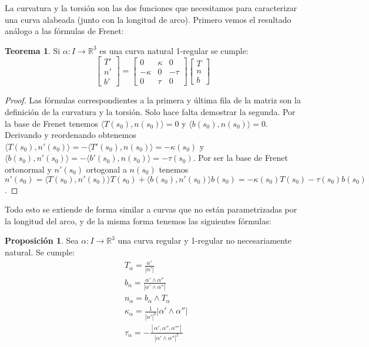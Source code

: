 \documentclass{article}
\theoremstyle{definition}
\newtheorem{theorem}{Teorema}
\newtheorem{prop}{Proposición}
\newcommand{\reales}{\mathbb{R}}
\begin{document}
La curvatura y la torsión son las dos funciones que necesitamos para caracterizar una curva alabeada (junto con la longitud de arco). Primero vemos el resultado análogo a las fórmulas de Frenet:

\begin{theorem}
	Si $\alpha: I \rightarrow \reales^3$ es una curva natural 1-regular se cumple:
	\begin{equation*}
		\begin{bmatrix}
			T' \\
			n' \\
			b' 
		\end{bmatrix}
		=
		\begin{bmatrix}
			0 & \kappa & 0 \\
			-\kappa & 0 & -\tau \\
			0 & \tau & 0 
		\end{bmatrix}
		\begin{bmatrix}
			T \\
			n \\
			b 
		\end{bmatrix}
	\end{equation*}
\end{theorem}

\begin{proof}
	Las fórmulas correspondientes a la primera y última fila de la matriz son la definición de la curvatura y la torsión. Solo hace falta demostrar la segunda. Por la base de Frenet tenemos $\langle T(s_0), n(s_0) \rangle = 0$ y $\langle b(s_0), n(s_0) \rangle = 0$. Derivando y reordenando obtenemos $\langle T(s_0), n'(s_0) \rangle = - \langle T'(s_0), n(s_0) \rangle = -\kappa(s_0)$ y $\langle b(s_0), n'(s_0) \rangle = - \langle b'(s_0), n(s_0) \rangle = -\tau(s_0)$. Por ser la base de Frenet ortonormal y $n'(s_0)$ ortogonal a $n(s_0)$ tenemos $n'(s_0) = \langle T(s_0), n'(s_0) \rangle T(s_0) + \langle b(s_0), n'(s_0) \rangle b(s_0) = -\kappa(s_0)T(s_0) - \tau(s_0) b(s_0)$.
\end{proof}

Todo esto se extiende de forma similar a curvas que no están parametrizadas por la longitud del arco, y de la misma forma tenemos las siguientes fórmulas:

\begin{prop}
	Sea $\alpha : I \rightarrow \reales^3$ una curva regular y 1-regular no necesariamente natural. Se cumple:
	\begin{equation*}
	\begin{split}
		& T_{\alpha} = \frac{\alpha'}{|\alpha'|} \\ 
		& b_{\alpha} = \frac{\alpha' \wedge \alpha''}{|\alpha' \wedge \alpha''|}\\ 
		& n_{\alpha} = b_{\alpha} \wedge T_{\alpha}\\
		& \kappa_{\alpha} = \frac{1}{|\alpha'|^3} |\alpha' \wedge \alpha''|\\
		& \tau_{\alpha} = -\frac{[\alpha', \alpha'', \alpha''']}{|\alpha' \wedge \alpha''|^2}
	\end{split}
	\end{equation*}
\end{prop}
\end{document}
